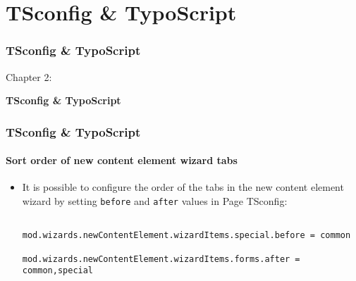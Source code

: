 %

\section{TSconfig \& TypoScript}
\begin{frame}[fragile]
	\frametitle{TSconfig \& TypoScript}

	\begin{center}\huge{Chapter 2:}\end{center}
	\begin{center}\huge{\color{typo3darkgrey}\textbf{TSconfig \& TypoScript}}\end{center}

\end{frame}

\begin{frame}[fragile]
	\frametitle{TSconfig \& TypoScript}
	\framesubtitle{Sort order of new content element wizard tabs}

	\lstset{basicstyle=\tiny\ttfamily}

	\begin{itemize}
		\item It is possible to configure the order of the tabs in the new content element
			wizard by setting \texttt{before} and \texttt{after} values in Page TSconfig:

			\begin{lstlisting}
				mod.wizards.newContentElement.wizardItems.special.before = common
				mod.wizards.newContentElement.wizardItems.forms.after = common,special
			\end{lstlisting}

	\end{itemize}

\end{frame}

